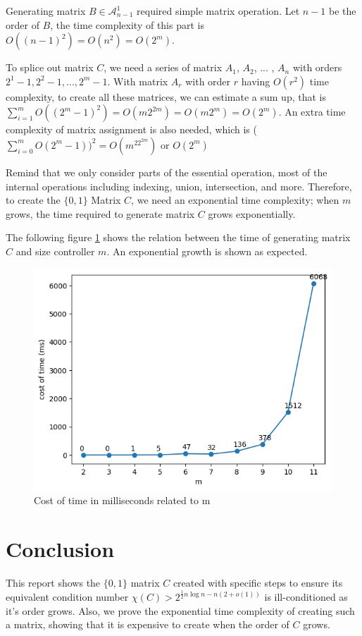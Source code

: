 \documentclass[11pt]{article}
\begin{document}
Generating matrix $B\in \mathcal{A}_{n - 1}^1$ required simple matrix operation. Let $n - 1$ be the order of $B$, the time complexity of this part is $O((n-1)^2) = O(n^2) = O(2^m)$.

To splice out matrix $C$, we need a series of matrix $A_1$, $A_2$, ... , $A_n$ with orders $2^1-1, 2^2-1, ..., 2^m-1$. With matrix $A_r$ with order $r$ having $O(r^2)$ time complexity, to create all these matrices, we can estimate a sum up, that is $\sum_{i=1}^{m}O((2^m - 1)^2) = O(m2^{2m}) = O(m2^m) = O(2^m)$. An extra time complexity of matrix assignment is also needed, which is ($\sum_{i=0}^{m}O(2^m - 1))^2 = O(m^22^{2m})$ or $O(2^m)$

Remind that we only consider parts of the essential operation, most of the internal operations including indexing, union, intersection, and more. Therefore, to create the $\{0, 1\}$ Matrix $C$, we need an exponential time complexity; when $m$ grows, the time required to generate matrix $C$ grows exponentially.

The following figure \ref{costoftime} shows the relation between the time of generating matrix $C$ and size controller $m$. An exponential growth is shown as expected.

\begin{figure}[htp]
    \centering
    \includegraphics{fig/output.png}
    \caption{Cost of time in milliseconds related to m}\label{costoftime}
\end{figure}

\section{Conclusion}
This report shows the $\{0, 1\}$ matrix $C$ created with specific steps to ensure its equivalent condition number $\chi(C) > 2^{\frac{1}{2}n\log n-n(2+o(1))}$ is ill-conditioned as it's order grows. Also, we prove the exponential time complexity of creating such a matrix, showing that it is expensive to create when the order of $C$ grows.
\end{document}
